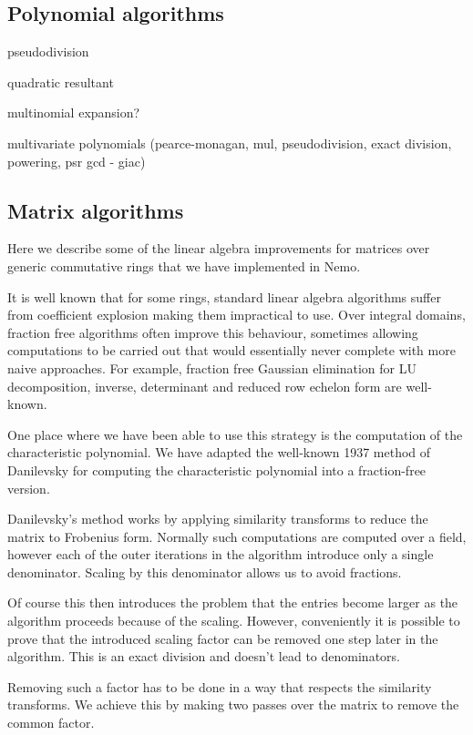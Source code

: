 \documentclass{sig-alternate-05-2015}
\begin{document}
\subsection{Polynomial algorithms}

pseudodivision

quadratic resultant

multinomial expansion?

multivariate polynomials (pearce-monagan, mul, pseudodivision, exact division, powering, psr gcd - giac)

\subsection{Matrix algorithms}

Here we describe
some of the linear algebra improvements for matrices over generic commutative
rings that we have implemented in Nemo.

It is well known that for some rings, standard linear algebra algorithms
suffer from coefficient explosion making them impractical to use.
Over integral domains, fraction
free algorithms often improve this behaviour, sometimes allowing computations
to be carried out that would essentially never complete with more naive
approaches. For example, fraction free Gaussian elimination
for LU decomposition, inverse, determinant and reduced row echelon form
are well-known.

One place where we have been able to use this strategy is the computation
of the characteristic polynomial. We have adapted the well-known 1937 method
of Danilevsky for computing the characteristic polynomial into a fraction-free
version.

Danilevsky's method works by applying similarity transforms to reduce the
matrix to Frobenius form. Normally such computations are computed over a
field, however each of the outer iterations in the algorithm introduce only
a single denominator. Scaling by this denominator allows us to avoid
fractions.

Of course this then introduces the problem that the entries become larger
as the algorithm proceeds because of the scaling. However, conveniently
it is possible to prove that the introduced scaling factor can be removed 
one step later in the algorithm. This is an exact division and doesn't
lead to denominators.

Removing such a factor has to be done in a way that respects the
similarity transforms. We achieve this by making two passes over the matrix
to remove the common factor.
\end{document}

